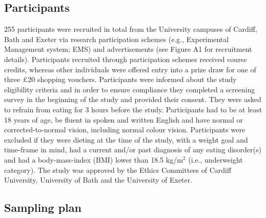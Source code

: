 \documentclass[man,floatsintext]{apa6}
\begin{document}
\hypertarget{participants}{%
\subsection{Participants}\label{participants}}

\par

255 participants were recruited in total from the University campuses of Cardiff, Bath and Exeter via research participation schemes (e.g., Experimental Management system; EMS) and advertisements (see Figure A1 for recruitment details). Participants recruited through participation schemes received course credits, whereas other individuals were offered entry into a prize draw for one of three £20 shopping vouchers. Participants were informed about the study eligibility criteria and in order to ensure compliance they completed a screening survey in the beginning of the study and provided their consent. They were asked to refrain from eating for 3 hours before the study. Participants had to be at least 18 years of age, be fluent in spoken and written English and have normal or corrected-to-normal vision, including normal colour vision. Participants were excluded if they were dieting at the time of the study, with a weight goal and time-frame in mind, had a current and/or past diagnosis of any eating disorder(s) and had a body-mass-index (BMI) lower than 18.5 kg/m\(^{2}\) (i.e., underweight category). The study was approved by the Ethics Committees of Cardiff University, University of Bath and the University of Exeter.

\hypertarget{sampling}{%
\subsection{Sampling plan}\label{sampling}}

\par
\end{document}
